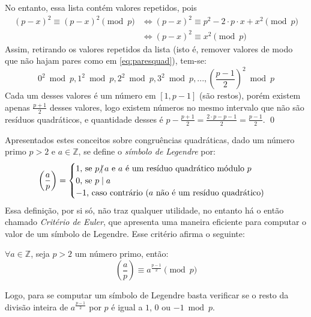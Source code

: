 No entanto, essa lista contém valores repetidos, pois
\begin{align}
    (p-x)^2 \equiv (p-x)^2 \pmod{p} & \Longleftrightarrow
    (p-x)^2 \equiv p^2 - 2 \cdot p \cdot x + x^2 \pmod{p} 
    \\
    & \Longleftrightarrow (p-x)^2 \equiv x^2 \pmod{p} \label{eq:paresquad}
\end{align}
Assim, retirando os valores repetidos da lista (isto é, remover valores de modo que não hajam pares como em \ref{eq:paresquad}), tem-se:
\begin{equation*}
    0^2 \bmod{p}, 1^2 \bmod{p}, 2^2 \bmod{p}, 3^2 \bmod{p}, ..., \left(\frac{p -1}{2} \right)^2 \bmod{p} 
\end{equation*}
Cada um desses valores é um número em $[1, p-1]$ (são restos), porém existem apenas $\frac{p+1}{2}$ desses valores, logo existem números no mesmo intervalo que não são resíduos quadráticos, e quantidade desses é $p - \frac{p+1}{2} = \frac{2 \cdot p - p - 1}{2} = \frac{p - 1}{2}$. \qed


Apresentados estes conceitos sobre congruências quadráticas, dado um número primo $p > 2$ e $a \in \mathbb{Z}$, se define o \textit{símbolo de Legendre} por:
\begin{equation*}
    \left( \frac{a}{p} \right) = \begin{cases}
        1 \text{, se $p \hspace{-4pt}\not|\hspace{2pt} a$ e $a$ é um resíduo quadrático módulo $p$}
        \\
        0 \text{, se $p \mid a$}
        \\
        -1 \text{, caso contrário ($a$ não é um resíduo quadrático)}
        \end{cases}
\end{equation*}
Essa definição, por si só, não traz qualquer utilidade, no entanto há o então chamado \textit{Critério de Euler}, que apresenta uma maneira eficiente para computar o valor de um símbolo de Legendre. Esse critério afirma o seguinte:
\begin{teorema} $\forall a \in \mathbb{Z}$, seja $p > 2$ um número primo, então: \label{teorema:criteriodeeuler}
    \begin{equation*}
        \left( \frac{a}{p} \right) \equiv a^{\frac{p-1}{2}} \pmod p
    \end{equation*}
\end{teorema}
\noindent
Logo, para se computar um símbolo de Legendre basta verificar se o resto da divisão inteira de $a^{\frac{p-1}{2}}$ por $p$ é igual a $1$, $0$ ou $-1 \bmod p$.

